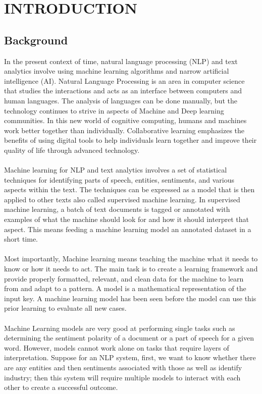 \chapter{INTRODUCTION}

\section{Background}
\vspace{10pt}
In the present context of time, natural language processing (NLP) and text analytics involve using machine learning algorithms and narrow artificial intelligence (AI). Natural Language Processing is an area in computer science that studies the interactions and acts as an interface between computers and human languages. The analysis of languages can be done manually, but the technology continues to strive in aspects of Machine and Deep learning communities. In this new world of cognitive computing, humans and machines work better together than individually. Collaborative learning emphasizes the benefits of using digital tools to help individuals learn together and improve their quality of life through advanced technology.\\
\\
Machine learning for NLP and text analytics involves a set of statistical techniques for identifying parts of speech, entities, sentiments, and various aspects within the text. The techniques can be expressed as a model that is then applied to other texts also called supervised machine learning. In supervised machine learning, a batch of text documents is tagged or annotated with examples of what the machine should look for and how it should interpret that aspect. This means feeding a machine learning model an annotated dataset in a short time.\\
\\
Most importantly, Machine learning means teaching the machine what it needs to know or how it needs to act. The main task is to create a learning framework and provide properly formatted, relevant, and clean data for the machine to learn from and adapt to a pattern. A model is a mathematical representation of the input key. A machine learning model has been seen before the model can use this prior learning to evaluate all new cases.\\
\\
Machine Learning models are very good at performing single tasks such as determining the sentiment polarity of a document or a part of speech for a given word. However, models cannot work alone on tasks that require layers of interpretation. Suppose for an NLP system, first, we want to know whether there are any entities and then sentiments associated with those as well as identify industry; then this system will require multiple models to interact with each other to create a successful outcome.

